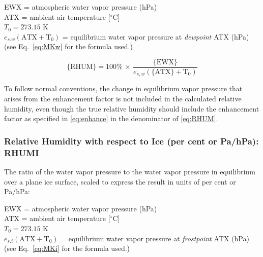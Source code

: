 \documentclass[
  english,
]{book}
\begin{document}
EWX = atmospheric water vapor pressure (hPa)\\
ATX = ambient air temperature {[}\(^{\circ}\mathrm{C}\){]}\\
\(T_{0}=273.15\) K\\
\(e_{s.w}(\mathrm{ATX+T_{0}})\) = equilibrium water vapor pressure
at \emph{dewpoint} ATX (hPa)\\
\hspace*{0.333em}\hspace*{0.333em}\hspace*{0.333em}\hspace*{0.333em}\hspace*{0.333em}\hspace*{0.333em}\hspace*{0.333em}\hspace*{0.333em}\hspace*{0.333em}\hspace*{0.333em}(see Eq.~\eqref{eq:MKw} for the formula
used.)

\begin{equation}
\mathrm{\{RHUM\}}=100\%\,\times\,\frac{\mathrm{\{EWX\}}}{e_{s,w}(\mathrm{\{ATX\}+T_{0}})}
\label{eq:RHUM}
\end{equation}

To follow normal conventions, the change in equilibrium vapor pressure that arises from the enhancement factor is not included in the calculated relative humidity, even though the true relative humidity should include the enhancement factor as specified in \eqref{eq:enhance} in the denominator of \eqref{eq:RHUM}.

\hypertarget{rhumi}{%
\subsubsection*{Relative Humidity with respect to Ice (per cent or Pa/hPa): RHUMI}\label{rhumi}}

The ratio of the water vapor pressure to the water vapor pressure in equilibrium over a plane ice surface, scaled to express the result in units of per cent or Pa/hPa:

EWX = atmospheric water vapor pressure (hPa)\\
ATX = ambient air temperature {[}\(^{\circ}\mathrm{C}\){]}\\
\(T_{0}=273.15\) K\\
\(e_{s.i}(\mathrm{ATX+T_{0}})\) = equilibrium water vapor pressure
at \emph{frostpoint} ATX (hPa)\\
\hspace*{0.333em}\hspace*{0.333em}\hspace*{0.333em}\hspace*{0.333em}\hspace*{0.333em}\hspace*{0.333em}\hspace*{0.333em}\hspace*{0.333em}\hspace*{0.333em}\hspace*{0.333em}(see Eq.~\eqref{eq:MKi} for the formula
used.)
\end{document}
